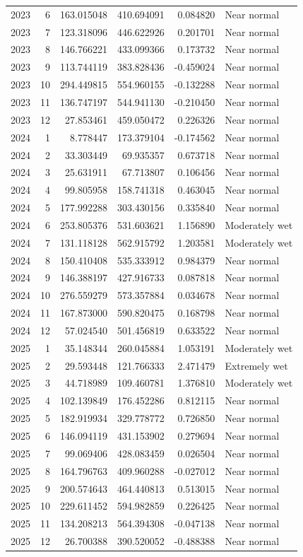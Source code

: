 \begin{tabular}{rrrrrl}
2023 & 6 & 163.015048 & 410.694091 & 0.084820 & Near normal \\
2023 & 7 & 123.318096 & 446.622926 & 0.201701 & Near normal \\
2023 & 8 & 146.766221 & 433.099366 & 0.173732 & Near normal \\
2023 & 9 & 113.744119 & 383.828436 & -0.459024 & Near normal \\
2023 & 10 & 294.449815 & 554.960155 & -0.132288 & Near normal \\
2023 & 11 & 136.747197 & 544.941130 & -0.210450 & Near normal \\
2023 & 12 & 27.853461 & 459.050472 & 0.226326 & Near normal \\
2024 & 1 & 8.778447 & 173.379104 & -0.174562 & Near normal \\
2024 & 2 & 33.303449 & 69.935357 & 0.673718 & Near normal \\
2024 & 3 & 25.631911 & 67.713807 & 0.106456 & Near normal \\
2024 & 4 & 99.805958 & 158.741318 & 0.463045 & Near normal \\
2024 & 5 & 177.992288 & 303.430156 & 0.335840 & Near normal \\
2024 & 6 & 253.805376 & 531.603621 & 1.156890 & Moderately wet \\
2024 & 7 & 131.118128 & 562.915792 & 1.203581 & Moderately wet \\
2024 & 8 & 150.410408 & 535.333912 & 0.984379 & Near normal \\
2024 & 9 & 146.388197 & 427.916733 & 0.087818 & Near normal \\
2024 & 10 & 276.559279 & 573.357884 & 0.034678 & Near normal \\
2024 & 11 & 167.873000 & 590.820475 & 0.168798 & Near normal \\
2024 & 12 & 57.024540 & 501.456819 & 0.633522 & Near normal \\
2025 & 1 & 35.148344 & 260.045884 & 1.053191 & Moderately wet \\
2025 & 2 & 29.593448 & 121.766333 & 2.471479 & Extremely wet \\
2025 & 3 & 44.718989 & 109.460781 & 1.376810 & Moderately wet \\
2025 & 4 & 102.139849 & 176.452286 & 0.812115 & Near normal \\
2025 & 5 & 182.919934 & 329.778772 & 0.726850 & Near normal \\
2025 & 6 & 146.094119 & 431.153902 & 0.279694 & Near normal \\
2025 & 7 & 99.069406 & 428.083459 & 0.026504 & Near normal \\
2025 & 8 & 164.796763 & 409.960288 & -0.027012 & Near normal \\
2025 & 9 & 200.574643 & 464.440813 & 0.513015 & Near normal \\
2025 & 10 & 229.611452 & 594.982859 & 0.226425 & Near normal \\
2025 & 11 & 134.208213 & 564.394308 & -0.047138 & Near normal \\
2025 & 12 & 26.700388 & 390.520052 & -0.488388 & Near normal \\
\bottomrule
\end{tabular}
